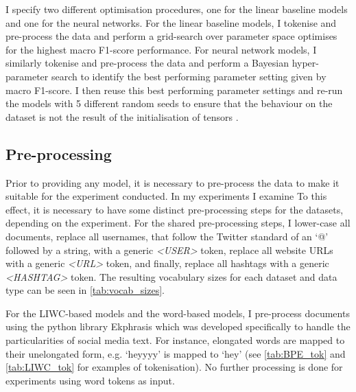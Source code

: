 I specify two different optimisation procedures, one for the linear baseline models and one for the neural networks.
For the linear baseline models, I tokenise and pre-process the data and perform a grid-search over  parameter space  optimises for the highest macro F1-score performance.
For neural network models, I similarly tokenise and pre-process the data and perform a Bayesian hyper-parameter search to identify the best performing parameter setting given by macro F1-score.
I then reuse this best performing parameter settings and re-run the models with 5 different random seeds to ensure that the  behaviour on the dataset is not the result of the  initialisation of  tensors .

\subsection{Pre-processing}
Prior to providing  any model, it is necessary to pre-process the data to make it suitable for the experiment conducted.
In my experiments I examine 
To this effect, it is necessary to have some  distinct pre-processing steps for the datasets, depending on the experiment.
For the shared pre-processing steps, I lower-case all documents, replace all usernames, that follow the Twitter standard of an `@' followed by a string, with a generic \textit{<USER>} token, replace all website URLs with a generic \textit{<URL>} token, and finally, replace all hashtags with a generic \textit{<HASHTAG>} token.
The resulting vocabulary sizes for each dataset and data type can be seen in \cref{tab:vocab_sizes}.

For the LIWC-based models and the word-based models, I pre-process documents using the python library Ekphrasis \citep{baziotis:2017} which was developed specifically to handle the particularities of social media text.
For instance, elongated words are mapped to their unelongated form, e.g. `heyyyy' is mapped to `hey' (see \cref{tab:BPE_tok} and \cref{tab:LIWC_tok} for examples of tokenisation).
No further processing is done for experiments using word tokens as input.

